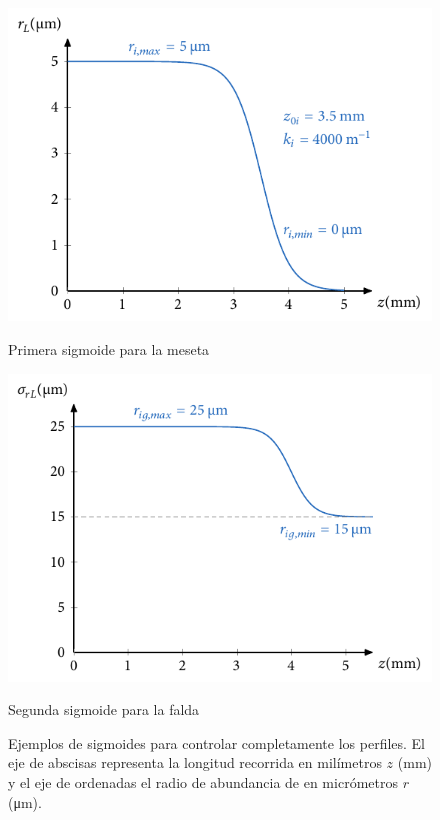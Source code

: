 \begin{figure}[htbp]
  \centering
  \begin{subcaptionblock}{.4\textwidth}
    \centering
    \includegraphics[width=\textwidth]{Figuras/ch4_ejsigm3.pdf}
    \caption{Primera sigmoide para la meseta}\label{fig:ch4_ssigma}
  \end{subcaptionblock}
  \begin{subcaptionblock}{.4\textwidth}
    \centering
    \includegraphics[width=\textwidth]{Figuras/ch4_ejsigm4.pdf}
    \caption{Segunda sigmoide para la falda}\label{fig:ch4_ssigmb}
  \end{subcaptionblock}
   \caption{Ejemplos de sigmoides para controlar completamente los perfiles. El eje de abscisas representa la longitud recorrida en milímetros $z$ (\unit{mm}) y el eje de ordenadas el radio de abundancia de  en micrómetros $r$ (\unit{\um}).}
   \label{fig:4.19}
\end{figure}

